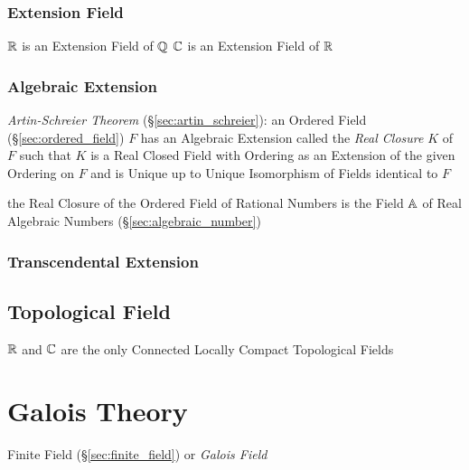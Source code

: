 \subsubsection{Extension Field}\label{sec:extension_field}

$\mathbb{R}$ is an Extension Field of $\mathbb{Q}$
$\mathbb{C}$ is an Extension Field of $\mathbb{R}$



\subsubsection{Algebraic Extension}\label{sec:algebraic_extension}

\emph{Artin-Schreier Theorem} (\S\ref{sec:artin_schreier}): an Ordered Field
(\S\ref{sec:ordered_field}) $F$ has an Algebraic Extension called the
\emph{Real Closure} $K$ of $F$ such that $K$ is a Real Closed Field with
Ordering as an Extension of the given Ordering on $F$ and is Unique up to
Unique Isomorphism of Fields identical to $F$

the Real Closure of the Ordered Field of Rational Numbers is the Field $\mathbb{A}$
of Real Algebraic Numbers (\S\ref{sec:algebraic_number})



\subsubsection{Transcendental Extension}
\label{sec:transcendental_extension}



\subsection{Topological Field}\label{sec:topological_field}

$\mathbb{R}$ and $\mathbb{C}$ are the only Connected Locally Compact
Topological Fields



\section{Galois Theory}\label{sec:galois_theory}

Finite Field (\S\ref{sec:finite_field}) or \emph{Galois Field}

